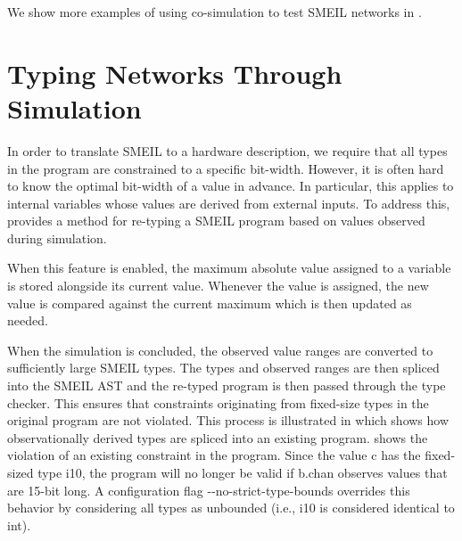 We show more examples of using co-simulation to test SMEIL networks in
.



\section{Typing Networks Through Simulation}
\label{sec:typing}
In order to translate SMEIL to a hardware description, we require that all types
in the program are constrained to a specific bit-width. However, it is often
hard to know the optimal bit-width of a value in advance. In particular, this
applies to internal variables whose values are derived from external inputs. To
address this, \libsme{} provides a method for re-typing a SMEIL program based on
values observed during simulation.

When this feature is enabled, the maximum absolute value assigned to a variable
is stored alongside its current value. Whenever the value is assigned, the new
value is compared against the current maximum which is then updated as needed.


When the simulation is concluded, the observed value ranges are converted to
sufficiently large SMEIL types. The types and observed ranges are then spliced
into the SMEIL AST and the re-typed program is then passed through the type
checker. This ensures that constraints originating from fixed-size types in the
original program are not violated. This process is illustrated in
 which shows how observationally derived types are spliced
into an existing program.  shows the violation of an existing
constraint in the program. Since the value {\ttfamily c} has the fixed-sized
type {\ttfamily i10}, the program will no longer be valid if {\ttfamily b.chan}
observes values that are 15-bit long. A configuration flag {\ttfamily
  -{}-no-strict-type-bounds} overrides this behavior by considering all types as
unbounded (i.e., {\ttfamily i10} is considered identical to {\ttfamily int}).


